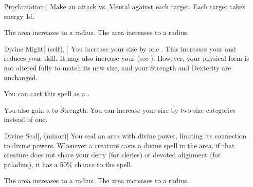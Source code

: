 \lowercase{\hypertarget{spell:Proclamation}{}}\label{spell:Proclamation}
\begin{freeability}[Rank 3]{\hypertarget{spell:Proclamation}{Proclamation}}[]
Make an attack vs. Mental against each target.
\hit Each target takes energy  \minus1d.

\rankline
{} The area increases to a \arealarge radius.
 The area increases to a \areahuge radius.
\end{freeability}
\vspace{0.25em}



\lowercase{\hypertarget{spell:Divine Might}{}}\label{spell:Divine Might}
\begin{attuneability}[Rank 4]{\hypertarget{spell:Divine Might}{Divine Might}}[ (self), ]
You increase your size by one .
This increases your  and reduces your  skill.
It may also increase your  (see ).
However, your physical form is not altered fully to match its new size, and your Strength and Dexterity are unchanged.

You can cast this spell as a .

\rankline
{} You also gain a   to Strength.
 You can increase your size by two size categories instead of one.
\end{attuneability}
\vspace{0.25em}



\lowercase{\hypertarget{spell:Divine Seal}{}}\label{spell:Divine Seal}
\begin{freeability}[Rank 4]{\hypertarget{spell:Divine Seal}{Divine Seal}}[,  (minor)]
You seal an area with divine power, limiting its connection to divine powers.
Whenever a creature casts a divine spell in the area, if that creature does not share your deity (for clerics) or devoted alignment (for paladins), it has a 50\% chance to  the spell.

\rankline
{} The area increases to a \areamed radius.
 The area increases to a \arealarge radius.
\end{freeability}
\vspace{0.25em}



